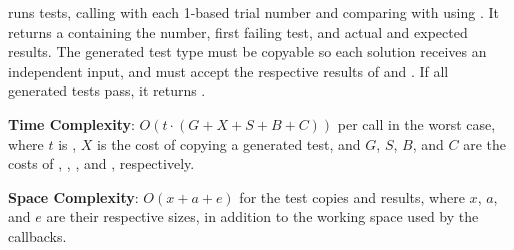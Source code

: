\begin{compactitem}
  \item {} runs  tests, calling  with each 1-based trial number and comparing  with  using . It returns a  containing the number, first failing test, and actual and expected results. The generated test type must be copyable so each solution receives an independent input, and  must accept the respective results of  and . If all generated tests pass, it returns .
\end{compactitem}

\textbf{Time Complexity}: $O(t \cdot (G + X + S + B + C))$ per call in the worst case, where $t$ is , $X$ is the cost of copying a generated test, and $G$, $S$, $B$, and $C$ are the costs of , , , and , respectively.

\textbf{Space Complexity}: $O(x + a + e)$ for the test copies and results, where $x$, $a$, and $e$ are their respective sizes, in addition to the working space used by the callbacks.

